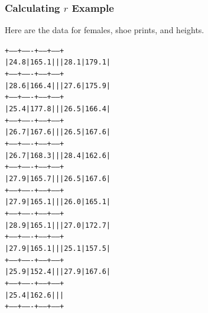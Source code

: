 \documentclass[xcolor=dvipsnames]{beamer}
\begin{document}
\begin{frame}
  \frametitle{Calculating $r$ Example}
  Here are the data for females, shoe prints, and heights.
\begin{alltt}
\scriptsize
+-----+-------+------+-----+\newline
| 24.8|165.1 ||| 28.1|179.1|\newline
+-----+-------+------+-----+\newline
| 28.6|166.4 ||| 27.6|175.9|\newline
+-----+-------+------+-----+\newline
| 25.4|177.8 ||| 26.5|166.4|\newline
+-----+-------+------+-----+\newline
| 26.7|167.6 ||| 26.5|167.6|\newline
+-----+-------+------+-----+\newline
| 26.7|168.3 ||| 28.4|162.6|\newline
+-----+-------+------+-----+\newline
| 27.9|165.7 ||| 26.5|167.6|\newline
+-----+-------+------+-----+\newline
| 27.9|165.1 ||| 26.0|165.1|\newline
+-----+-------+------+-----+\newline
| 28.9|165.1 ||| 27.0|172.7|\newline
+-----+-------+------+-----+\newline
| 27.9|165.1 ||| 25.1|157.5|\newline
+-----+-------+------+-----+\newline
| 25.9|152.4 ||| 27.9|167.6|\newline
+-----+-------+------+-----+\newline
| 25.4|162.6 |||\newline
+-----+-------+------+-----+
\end{alltt}
\end{frame}
\end{document}

